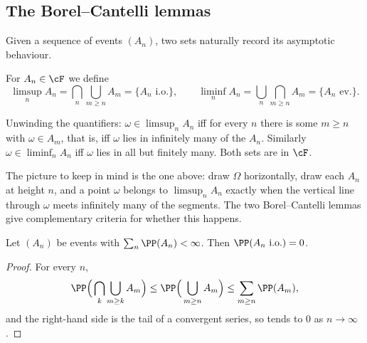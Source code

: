 \subsection{The Borel--Cantelli lemmas}

Given a sequence of events $(A_n)$, two sets naturally record its asymptotic behaviour.

\begin{definition}
	For $A_n \in \cF$ we define
	$$
	\limsup_n A_n = \bigcap_{n} \bigcup_{m \geq n} A_m = \{A_n \text{ i.o.}\},\qquad
	\liminf_n A_n = \bigcup_n \bigcap_{m\geq n} A_m = \{A_n \text{ ev.}\}.
	$$
\end{definition}

Unwinding the quantifiers: $\omega \in \limsup_n A_n$ iff for every $n$ there is some $m \geq n$ with $\omega \in A_m$, that is, iff $\omega$ lies in infinitely many of the $A_n$. Similarly $\omega \in \liminf_n A_n$ iff $\omega$ lies in all but finitely many. Both sets are in $\cF$.

\begin{center}
\end{center}

The picture to keep in mind is the one above: draw $\Omega$ horizontally, draw each $A_n$ at height $n$, and a point $\omega$ belongs to $\limsup_n A_n$ exactly when the vertical line through $\omega$ meets infinitely many of the segments. The two Borel--Cantelli lemmas give complementary criteria for whether this happens.

\begin{lemma}\label{lem:bc1}
	Let $(A_n)$ be events with $\sum_n \PP(A_n) < \infty$. Then $\PP(A_n \text{ i.o.}) = 0$.
\end{lemma}
\begin{proof}
	For every $n$,
	$$
	\PP\Big( \bigcap_{k} \bigcup_{m\geq k} A_m \Big) \leq \PP\Big( \bigcup_{m \geq n} A_m \Big) \leq \sum_{m\geq n} \PP(A_m),
	$$
	and the right-hand side is the tail of a convergent series, so tends to $0$ as $n \to \infty$.
\end{proof}


